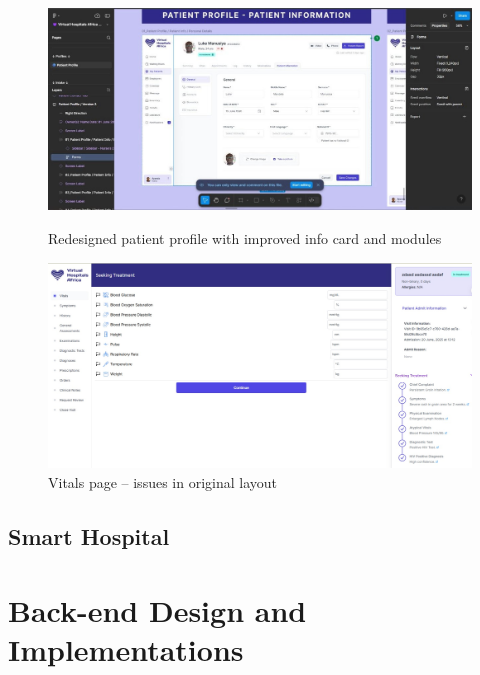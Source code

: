 \begin{figure}[H]
    \centering
    \begin{minipage}{0.47\textwidth}
        \centering
        \includegraphics[width=\textwidth]{images/(VHA)-5.jpg}
        \caption{Redesigned patient profile with improved info card and modules}
        \label{fig:desbign-5}
    \end{minipage}\hfill
    \begin{minipage}{0.47\textwidth}
        \centering
        \includegraphics[width=\textwidth]{images/(VHA)-6.jpg}
        \caption{Vitals page – issues in original layout}
        \label{fig:design-6}
    \end{minipage}
\end{figure}

\subsection{Smart Hospital}
\label{subsec:subsec02}


\section{Back-end Design and Implementations}
\label{sec:sec03}
